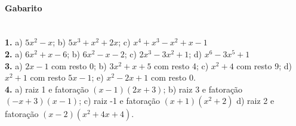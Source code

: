 \documentclass[a4paper,12pt]{article}
\begin{document}
\begin{multicols}{2}
\vspace*{5cm}
\end{multicols}
 
\vspace*{\fill}
{\footnotesize \color{darkgray}
\paragraph*{Gabarito} \hspace*{\fill}\\
\textbf{1.} a) $5x^2 - x$; b) $5x^3 + x^2 + 2x$; c) $x^4 + x^3 - x^2 + x - 1$\\
\textbf{2.} a) $6x^2 + x - 6$; b) $6x^2 - x - 2$; c) $2x^3 - 3x^2 + 1$; d) $x^6 - 3x^5 + 1$ \\
\textbf{3.} a) $2x - 1$ com resto 0; b) $3x^2 + x + 5$ com resto 4; c) $x^2 + 4$ com resto 9; d) $x^2  + 1$ com resto $5x-1$; e) $x^2-2x+1$ com resto 0.\\
\textbf{4.} a) raiz 1 e fatoração $(x-1)(2x+3)$; b) raiz 3 e fatoração $(-x+3)(x-1)$; c) raiz -1 e fatoração $(x+1)(x^2+2)$ d) raiz 2 e fatoração $(x-2)(x^2+4x+4)$.
}
\end{document}
